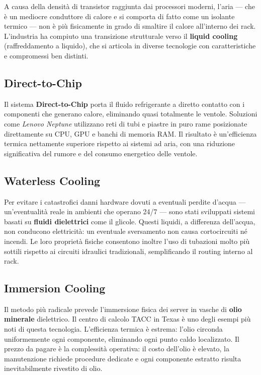\documentclass[
  italian,
  openany]{book}
\begin{document}
A causa della densità di transistor raggiunta dai processori moderni,
l'aria --- che è un mediocre conduttore di calore e si comporta di fatto
come un isolante termico --- non è più fisicamente in grado di smaltire
il calore all'interno dei rack. L'industria ha compiuto una transizione
strutturale verso il \textbf{liquid cooling} (raffreddamento a liquido),
che si articola in diverse tecnologie con caratteristiche e compromessi
ben distinti.

\subsection{Direct-to-Chip}\label{direct-to-chip}

Il sistema \textbf{Direct-to-Chip} porta il fluido refrigerante a
diretto contatto con i componenti che generano calore, eliminando quasi
totalmente le ventole. Soluzioni come \emph{Lenovo Neptune} utilizzano
reti di tubi e piastre in puro rame posizionate direttamente su CPU, GPU
e banchi di memoria RAM. Il risultato è un'efficienza termica nettamente
superiore rispetto ai sistemi ad aria, con una riduzione significativa
del rumore e del consumo energetico delle ventole.

\subsection{Waterless Cooling}\label{waterless-cooling}

Per evitare i catastrofici danni hardware dovuti a eventuali perdite
d'acqua --- un'eventualità reale in ambienti che operano 24/7 --- sono
stati sviluppati sistemi basati su \textbf{fluidi dielettrici} come il
glicole. Questi liquidi, a differenza dell'acqua, non conducono
elettricità: un eventuale sversamento non causa cortocircuiti né
incendi. Le loro proprietà fisiche consentono inoltre l'uso di tubazioni
molto più sottili rispetto ai circuiti idraulici tradizionali,
semplificando il routing interno al rack.

\subsection{Immersion Cooling}\label{immersion-cooling}

Il metodo più radicale prevede l'immersione fisica dei server in vasche
di \textbf{olio minerale} dielettrico. Il centro di calcolo TACC in
Texas è uno degli esempi più noti di questa tecnologia. L'efficienza
termica è estrema: l'olio circonda uniformemente ogni componente,
eliminando ogni punto caldo localizzato. Il prezzo da pagare è la
complessità operativa: il costo dell'olio è elevato, la manutenzione
richiede procedure dedicate e ogni componente estratto risulta
inevitabilmente rivestito di olio.
\end{document}
